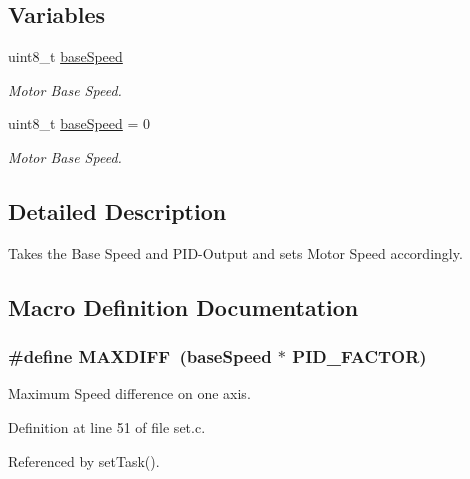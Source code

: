 \subsection*{Variables}
\begin{DoxyCompactItemize}
\item 
uint8\-\_\-t \hyperlink{group__set_gab2b0c78a81e045d7a8f28be307b8c61b}{base\-Speed}
\begin{DoxyCompactList}\small\item\em Motor Base Speed. \end{DoxyCompactList}\item 
uint8\-\_\-t \hyperlink{group__set_gab2b0c78a81e045d7a8f28be307b8c61b}{base\-Speed} = 0
\begin{DoxyCompactList}\small\item\em Motor Base Speed. \end{DoxyCompactList}\end{DoxyCompactItemize}


\subsection{Detailed Description}
Takes the Base Speed and P\-I\-D-\/\-Output and sets Motor Speed accordingly. 

\subsection{Macro Definition Documentation}
\hypertarget{group__set_ga3d4060e583ff657db3505ec8933d9b12}{
\subsubsection[{M\-A\-X\-D\-I\-F\-F}]{\setlength{\rightskip}{0pt plus 5cm}\#define M\-A\-X\-D\-I\-F\-F~({\bf base\-Speed} $\ast$ {\bf P\-I\-D\-\_\-\-F\-A\-C\-T\-O\-R})}}\label{group__set_ga3d4060e583ff657db3505ec8933d9b12}


Maximum Speed difference on one axis. 



Definition at line 51 of file set.\-c.



Referenced by set\-Task().



